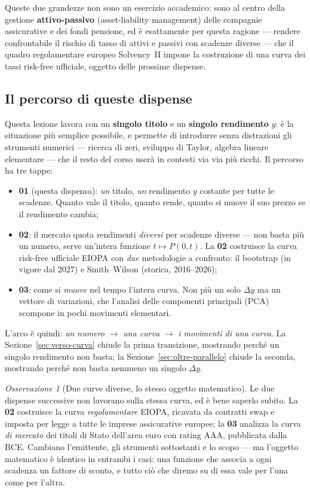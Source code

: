 \documentclass[11pt,a4paper]{article}
\theoremstyle{plain}
\theoremstyle{definition}
\theoremstyle{remark}
\newtheorem*{osservazione}{Osservazione}
\begin{document}
Queste due grandezze non sono un esercizio accademico: sono al centro della gestione
\textbf{attivo-passivo} (asset-liability management) delle compagnie assicurative e dei fondi
pensione, ed è esattamente per questa ragione --- rendere confrontabile il rischio di tasso di
attivi e passivi con scadenze diverse --- che il quadro regolamentare europeo Solvency~II
impone la costruzione di una curva dei tassi risk-free ufficiale, oggetto delle prossime
dispense.

\subsection{Il percorso di queste dispense}
\label{sec:percorso}

Questa lezione lavora con un \textbf{singolo titolo} e un \textbf{singolo rendimento} $y$: è la
situazione più semplice possibile, e permette di introdurre senza distrazioni gli strumenti
numerici --- ricerca di zeri, sviluppo di Taylor, algebra lineare elementare --- che il resto
del corso userà in contesti via via più ricchi. Il percorso ha tre tappe:
\begin{itemize}
  \item \textbf{01} (questa dispensa): \emph{un} titolo, \emph{un} rendimento $y$ costante per
        tutte le scadenze. Quanto vale il titolo, quanto rende, quanto si muove il suo prezzo
        se il rendimento cambia;
  \item \textbf{02}: il mercato quota rendimenti \emph{diversi} per scadenze diverse --- non
        basta più un numero, serve un'intera funzione $t\mapsto P(0,t)$. La \textbf{02}
        costruisce la curva risk-free ufficiale EIOPA con \emph{due} metodologie a confronto:
        il bootstrap (in vigore dal 2027) e Smith--Wilson (storica, 2016--2026);
  \item \textbf{03}: come si \emph{muove} nel tempo l'intera curva. Non più un solo $\Delta y$
        ma un vettore di variazioni, che l'analisi delle componenti principali (PCA)
        scompone in pochi movimenti elementari.
\end{itemize}

L'arco è quindi: \emph{un numero} $\to$ \emph{una curva} $\to$ \emph{i movimenti di una curva}.
La Sezione~\ref{sec:verso-curva} chiude la prima transizione, mostrando perché un singolo
rendimento non basta; la Sezione~\ref{sec:oltre-parallelo} chiude la seconda, mostrando perché
non basta nemmeno un singolo $\Delta y$.

\begin{osservazione}[Due curve diverse, lo stesso oggetto matematico]
Le due dispense successive non lavorano sulla stessa curva, ed è bene saperlo subito. La
\textbf{02} costruisce la curva \emph{regolamentare} EIOPA, ricavata da contratti swap e
imposta per legge a tutte le imprese assicurative europee; la \textbf{03} analizza la curva
\emph{di mercato} dei titoli di Stato dell'area euro con rating AAA, pubblicata dalla BCE.
Cambiano l'emittente, gli strumenti sottostanti e lo scopo --- ma l'oggetto matematico è
identico in entrambi i casi: una funzione che associa a ogni scadenza un fattore di sconto, e
tutto ciò che diremo su di essa vale per l'una come per l'altra.
\end{osservazione}
\end{document}
